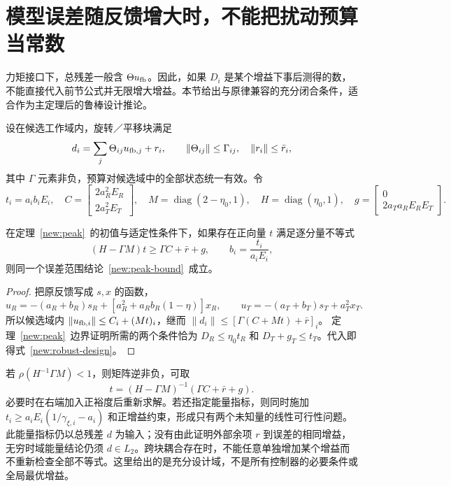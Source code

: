\section{模型误差随反馈增大时，不能把扰动预算当常数}

力矩接口下，总残差一般含 $\Theta u_{\rm fb}$。因此，如果 $D_i$ 是某个增益下事后测得的数，不能直接代入前节公式并无限增大增益。本节给出与原律兼容的充分闭合条件，适合作为主定理后的鲁棒设计推论。

设在候选工作域内，旋转／平移块满足
\[
d_i=\sum_j\Theta_{ij}u_{{\rm fb},j}+r_i,
\qquad\|\Theta_{ij}\|\le\Gamma_{ij},\quad
\|r_i\|\le\bar r_i,
\]
其中 $\Gamma$ 元素非负，预算对候选域中的全部状态统一有效。令
\[
t_i=a_ib_iE_i,\quad
C=\begin{bmatrix}2a_R^2E_R\\2a_T^2E_T\end{bmatrix},\quad
M=\operatorname{diag}(2-\eta_0,1),\quad
H=\operatorname{diag}(\eta_0,1),\quad
g=\begin{bmatrix}0\\2a_Ta_RE_RE_T\end{bmatrix}.
\]
\begin{theorem}[含反馈乘性残差的范围设计充分条件]\label{new:robust}
在定理~\ref{new:peak}~的初值与适定性条件下，如果存在正向量 $t$ 满足逐分量不等式
\begin{equation}
\boxed{(H-\Gamma M)t\ge\Gamma C+\bar r+g,\qquad
b_i=\frac{t_i}{a_iE_i},}
\label{new:robust-design}
\end{equation}
则同一个误差范围结论~\eqref{new:peak-bound}~成立。
\end{theorem}
\begin{proof}
把原反馈写成 $s,x$ 的函数，
\[
u_R=-(a_R+b_R)s_R+[a_R^2+a_Rb_R(1-\eta)]x_R,
\qquad
u_T=-(a_T+b_T)s_T+a_T^2x_T.
\]
所以候选域内 $\|u_{{\rm fb},i}\|\le C_i+(Mt)_i$，继而
$\|d_i\|\le[\Gamma(C+Mt)+\bar r]_i$。
定理~\ref{new:peak}~边界证明所需的两个条件恰为
$D_R\le\eta_0t_R$ 和 $D_T+g_T\le t_T$。代入即得式~\eqref{new:robust-design}。
\end{proof}

若 $\rho(H^{-1}\Gamma M)<1$，则矩阵逆非负，可取
\[
t=(H-\Gamma M)^{-1}(\Gamma C+\bar r+g).
\]
必要时在右端加入正裕度后重新求解。若还指定能量指标，则同时施加 $t_i\ge a_iE_i(1/\gamma_{\xi,i}-a_i)$ 和正增益约束，形成只有两个未知量的线性可行性问题。此能量指标仍以总残差 $d$ 为输入；没有由此证明外部余项 $r$ 到误差的相同增益，无穷时域能量结论仍须 $d\in L_2$。跨块耦合存在时，不能任意单独增加某个增益而不重新检查全部不等式。这里给出的是充分设计域，不是所有控制器的必要条件或全局最优增益。

